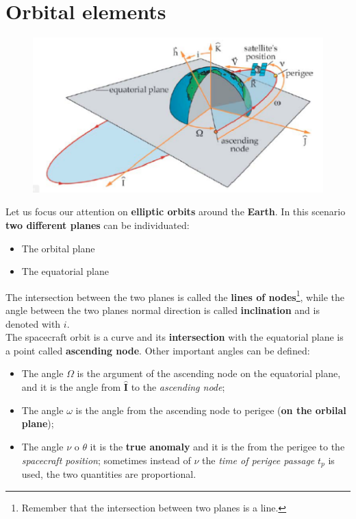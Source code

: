 \section{Orbital elements}
\begin{figure}[h]
    \centering
    \includegraphics[scale=0.7]{AerospaceApplications/images/OrbElements.png}
\end{figure}
Let us focus our attention on \textbf{elliptic orbits} around the \textbf{Earth}. In this scenario \textbf{two different planes} can be individuated:
\begin{itemize}
    \itemsep0em
    \item The orbital plane
    \item The equatorial plane
\end{itemize}
The intersection between the two planes is called the \textbf{lines of nodes}{\footnote[10]{
    Remember that the intersection between two planes is a line.
}}, while the angle between the two planes normal direction is called \textbf{inclination} and is denoted with $i$.\\
The spacecraft orbit is a curve and its \textbf{intersection} with the equatorial plane is a point called \textbf{ascending node}. Other important angles can be defined:
\begin{itemize}
    \item The angle $\Omega$ is the argument of the ascending node on the equatorial plane, and it is the angle from $\mathbf{\hat{I}}$ to the \textit{ascending node}; 
    \item The angle $\omega$ is the angle from the ascending node to perigee (\textbf{on the orbilal plane});
    \item The angle $\nu$ o $\theta$ it is the \textbf{true anomaly} and it is the from the perigee to the \textit{spacecraft position}; sometimes instead of $\nu$ the \textit{time of perigee passage} $t_p$ is used, the two quantities are proportional.
\end{itemize}
